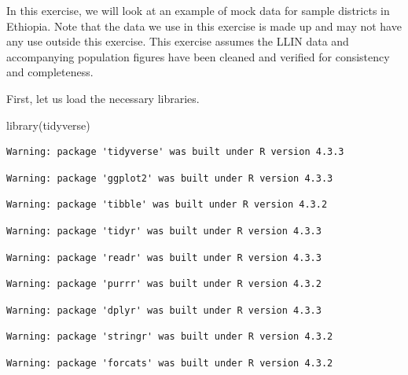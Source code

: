 \documentclass[
  letterpaper,
  DIV=11,
  numbers=noendperiod]{scrreprt}
\newenvironment{Shaded}{\begin{snugshade}}{\end{snugshade}}
\newcommand{\FunctionTok}[1]{\textcolor[rgb]{0.28,0.35,0.67}{#1}}
\newcommand{\NormalTok}[1]{\textcolor[rgb]{0.00,0.23,0.31}{#1}}
\begin{document}
In this exercise, we will look at an example of mock data for sample
districts in Ethiopia. Note that the data we use in this exercise is
made up and may not have any use outside this exercise. This exercise
assumes the LLIN data and accompanying population figures have been
cleaned and verified for consistency and completeness.

First, let us load the necessary libraries.~~~

\begin{Shaded}
\begin{Highlighting}[]
\FunctionTok{library}\NormalTok{(tidyverse)}
\end{Highlighting}
\end{Shaded}

\begin{verbatim}
Warning: package 'tidyverse' was built under R version 4.3.3
\end{verbatim}

\begin{verbatim}
Warning: package 'ggplot2' was built under R version 4.3.3
\end{verbatim}

\begin{verbatim}
Warning: package 'tibble' was built under R version 4.3.2
\end{verbatim}

\begin{verbatim}
Warning: package 'tidyr' was built under R version 4.3.3
\end{verbatim}

\begin{verbatim}
Warning: package 'readr' was built under R version 4.3.3
\end{verbatim}

\begin{verbatim}
Warning: package 'purrr' was built under R version 4.3.2
\end{verbatim}

\begin{verbatim}
Warning: package 'dplyr' was built under R version 4.3.3
\end{verbatim}

\begin{verbatim}
Warning: package 'stringr' was built under R version 4.3.2
\end{verbatim}

\begin{verbatim}
Warning: package 'forcats' was built under R version 4.3.2
\end{verbatim}
\end{document}
